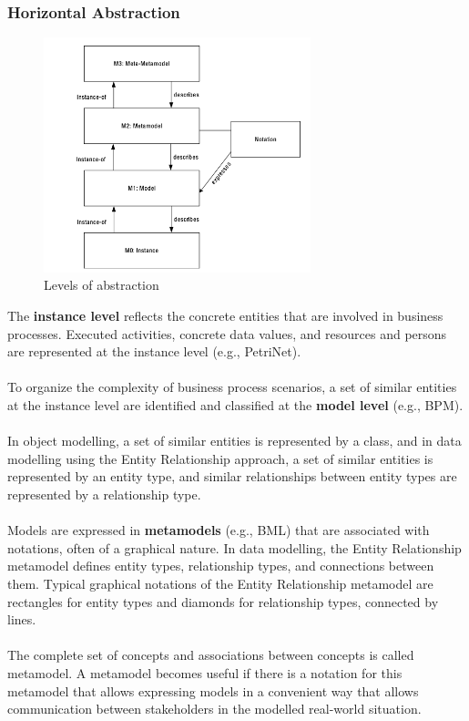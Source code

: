 \documentclass[10pt,a4paper]{article}
\begin{document}
\subsubsection{Horizontal Abstraction}
\begin{figure}[ht!]
 \hfill \includegraphics[width=220pt]{images/horizontal-abstraction}\hspace*{\fill}
 \caption{Levels of abstraction}
  \label{fig:ha}
\end{figure}
The \textbf{instance level} reflects the concrete entities that are involved in business processes. Executed activities, concrete data values, and resources and persons are represented at the instance level (e.g., PetriNet).\\ \\
To organize the complexity of business process scenarios, a set of similar entities at the instance level are identified and classified at the \textbf{model level} (e.g., BPM). \\ \\
In object modelling, a set of similar entities is represented by a class, and in data modelling using the Entity Relationship approach, a set of similar entities is represented by an entity type, and similar relationships between entity types are represented by a relationship type. \\ \\
Models are expressed in \textbf{metamodels} (e.g., BML) that are associated with notations, often of a graphical nature. In data modelling, the Entity Relationship metamodel defines entity types, relationship types, and connections between them. Typical graphical notations of the Entity Relationship metamodel are rectangles for entity types and diamonds for relationship types, connected by lines. \\ \\
The complete set of concepts and associations between concepts is called metamodel. A metamodel becomes useful if there is a notation for this metamodel that allows expressing models in a convenient way that allows communication between stakeholders in the modelled real-world situation.
\pagebreak
\end{document}
